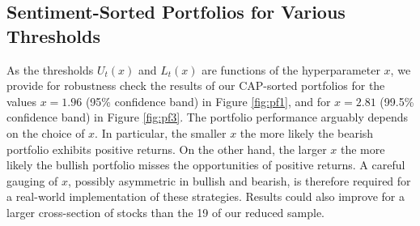 \subsection{Sentiment-Sorted Portfolios for Various Thresholds}\label{app_CAPport}
As the thresholds $U_t(x)$ and $L_t(x)$ are functions of the hyperparameter $x$, we provide for robustness check the results of our CAP-sorted portfolios for the values $x = 1.96$  (95\% confidence band) in Figure \ref{fig:pf1}, and for $x = 2.81$ (99.5\% confidence band) in Figure \ref{fig:pf3}. The portfolio performance arguably depends on the choice of $x$. In particular, the smaller $x$ the more likely the bearish portfolio exhibits positive returns. On the other hand, the larger $x$ the more likely the bullish portfolio misses the opportunities of positive returns. A careful gauging of $x$, possibly asymmetric in bullish and bearish, is therefore required for a real-world implementation of these strategies. Results could also improve for a larger cross-section of stocks than the 19 of our reduced sample.



